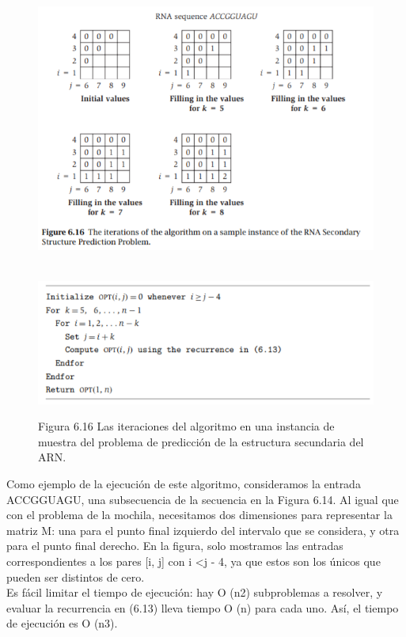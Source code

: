 \documentclass[a4paper]{article}
\begin{document}
\begin{figure}[h]
\centering
\includegraphics[scale=1]{Imagenes-Seccion6/fig6_16.PNG}
\caption{Figura 6.16 Las iteraciones del algoritmo en una instancia de muestra del problema de predicción de la estructura secundaria del ARN.}\\
\includegraphics[scale=1]{Imagenes-Seccion6/cod6_8.PNG}
\end{figure}

Como ejemplo de la ejecución de este algoritmo, consideramos la entrada ACCGGUAGU, una subsecuencia de la secuencia en la Figura 6.14. Al igual que con el problema de la mochila, necesitamos dos dimensiones para representar la matriz M: una para el punto final izquierdo del intervalo que se considera, y otra para el punto final derecho. En la figura, solo mostramos las entradas correspondientes a los pares [i, j] con i <j - 4, ya que estos son los únicos que pueden ser distintos de cero.\\

Es fácil limitar el tiempo de ejecución: hay O (n2) subproblemas a resolver, y evaluar la recurrencia en (6.13) lleva tiempo O (n) para cada uno. Así, el tiempo de ejecución es O (n3).\\
\end{document}
